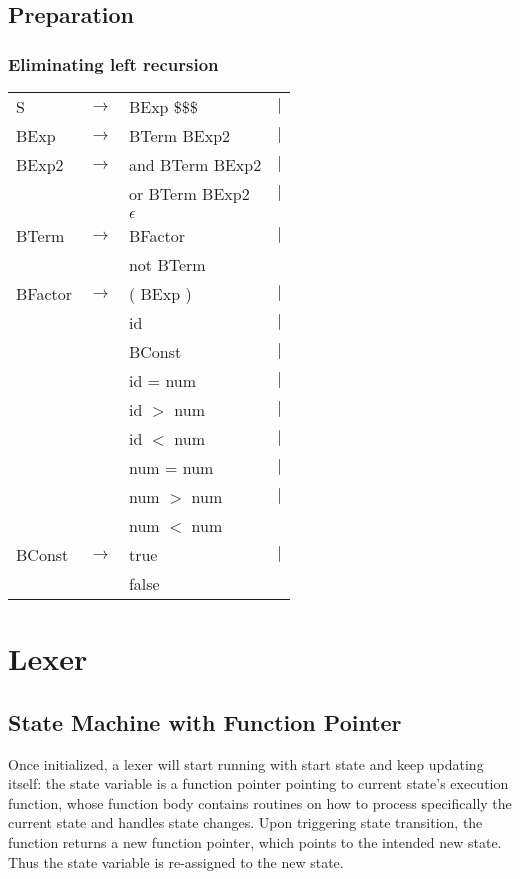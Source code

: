 \documentclass[%
 aip,
 jmp,%
 amsmath,amssymb,
 reprint,%
]{revtex4-1}
\begin{document}
\subsection{Preparation}
\subsubsection{Eliminating left recursion}
\begin{tabular}{lclr}
S	&$\rightarrow$& BExp \$\$\$			&$|$\\
BExp	&$\rightarrow$& BTerm BExp2		&$|$\\
BExp2	&$\rightarrow$& and BTerm BExp2	&$|$\\
		&&		or BTerm	 BExp2			&$|$\\
		&&		$\epsilon$				&\\
BTerm	&$\rightarrow$&	BFactor			&$|$\\
		&&		not BTerm				&\\
BFactor	&$\rightarrow$& ( BExp )			&$|$\\
		&&	   	id						&$|$\\
		&&	   	BConst					&$|$\\
		&&	   	id = num					&$|$\\
		&&	   	id $>$ num				&$|$\\
		&&	   	id $<$ num				&$|$\\
		&&	   	num = num				&$|$\\
		&&	   	num $>$ num				&$|$\\
		&&	   	num $<$ num				&\\
BConst	&$\rightarrow$& true				&$|$\\
		&&	   	false					&
\end{tabular}



\section{Lexer}


\subsection{State Machine with Function Pointer}

Once initialized, a lexer will start running with start state and keep updating
itself: the state variable is a function pointer pointing to current state's execution function, whose function body contains routines on how to process specifically the current state and handles state changes. Upon triggering state transition, the function returns a new function pointer, which points to the intended new state. Thus the state variable is re-assigned to the new state.
\end{document}
